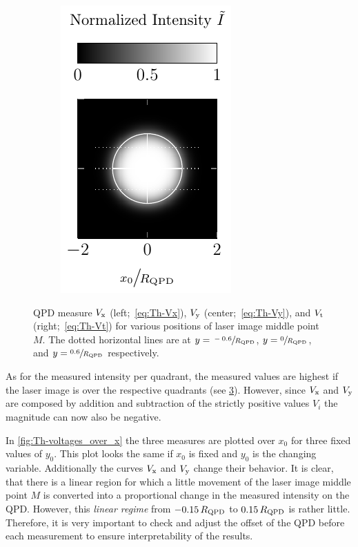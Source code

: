 \begin{figure}
\begin{subfigure}[b]{0.3\textwidth}
    \label{fig:Th-QPDy}
  \end{subfigure}
  \hfill
  \begin{subfigure}[b]{0.3\textwidth}
    \centering
    \includegraphics[]{Plots/cache/QPDt.pdf}
    \label{fig:Th-QPDt}
  \end{subfigure}
  \caption{QPD measure $V_{\mathrm{x}}$ (left;~\cref{eq:Th-Vx}), $V_{\mathrm{y}}$ 
    (center;~\cref{eq:Th-Vy}), and $V_{\mathrm{t}}$ (right;~\cref{eq:Th-Vt}) for 
    various positions of laser image middle point $M$. The dotted horizontal 
    lines are at $y=\sfrac{-0.6}{R_{\mathrm{QPD}}}$, $y=\sfrac{0}{R_{\mathrm{QPD}}}$, 
  and $y=\sfrac{0.6}{R_{\mathrm{QPD}}}$ respectively.}
  \label{fig:Th-QPDs}
 \end{figure}

As for the measured intensity per quadrant, the measured values are highest if 
the laser image is over the respective quadrants (see \cref{fig:Th-QPDs}). 
However, since $V_{\mathrm{x}}$ and $V_{\mathrm{y}}$ are composed by addition and 
subtraction of the strictly positive values $V_{i}$ the magnitude can now also 
be negative.

In \cref{fig:Th-voltages_over_x} the three measures are plotted over $x_{0}$ 
for three fixed values of $y_{0}$. This plot looks the same if $x_{0}$ is fixed 
and $y_{0}$ is the changing variable. Additionally the curves $V_{\mathrm{x}}$ and 
$V_{\mathrm{y}}$ change their behavior. It is clear, that there is a linear region 
for which a little movement of the laser image middle point $M$ is converted 
into a proportional change in the measured intensity on the QPD. However, this 
\emph{linear regime} from $-0.15\,R_{\mathrm{QPD}}$ to $0.15\,R_{\mathrm{QPD}}$ is 
rather little. Therefore, it is very important to check and adjust the offset 
of the QPD before each measurement to ensure interpretability of the results.

